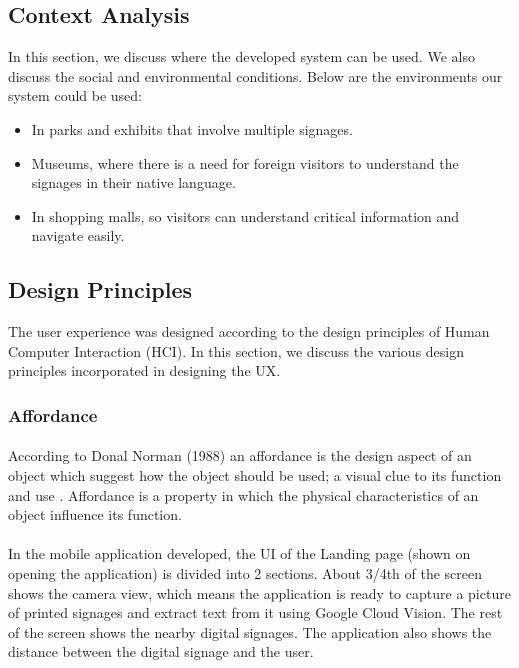 \documentclass[12pt]{article}
\begin{document}
    \subsection{Context Analysis}
    
    In this section, we discuss where the developed system can be used. We also discuss the social and environmental conditions. Below are the environments our system could be used:
    
   
\begin{itemize}

 \item In parks and exhibits that involve multiple signages.
 
  \item Museums, where there is a need for foreign visitors to understand the signages in their native language.
 
  \item In shopping malls, so visitors can understand critical information and navigate easily.
  
  \end{itemize}
  
    \subsection{Design Principles}
    
    The user experience was designed according to the design principles of Human Computer Interaction (HCI). In this section, we discuss the various design principles incorporated in designing the UX. 
    
    \subsubsection{Affordance}
    \paragraph{}According to Donal Norman (1988) an affordance is the design aspect of an object which suggest how the object should be used; a visual clue to its function and use \cite{norman}. Affordance is a property in which the physical characteristics of an object influence its function. 
    
    \paragraph{} In the mobile application developed, the UI of the Landing page (shown on opening the application) is divided into 2 sections. About 3/4th of the screen shows the camera view, which means the application is ready to capture a picture of printed signages and extract text from it using Google Cloud Vision. The rest of the screen shows the nearby digital signages. The application also shows the distance between the digital signage and the user.
    
\end{document}
